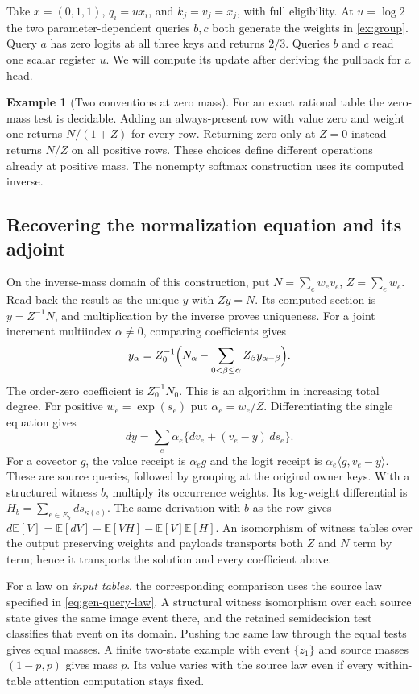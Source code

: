 \documentclass[11pt,a4paper]{article}
\theoremstyle{definition}
\newtheorem{example}[example]{Example}
\theoremstyle{remark}\newaliascnt{remark}{theorem}
\numberwithin{equation}{section}
\begin{document}
Take $x=(0,1,1)$, $q_i=u x_i$, and $k_j=v_j=x_j$, with full eligibility. At $u=\log 2$ the two parameter-dependent queries $b,c$ both generate the weights in \cref{ex:group}. Query $a$ has zero logits at all three keys and returns $2/3$. Queries $b$ and $c$ read one scalar register $u$. We will compute its update after deriving the pullback for a head.

\begin{example}[Two conventions at zero mass]
For an exact rational table the zero-mass test is decidable. Adding an always-present row with value zero and weight one returns $N/(1+Z)$ for every row. Returning zero only at $Z=0$ instead returns $N/Z$ on all positive rows. These choices define different operations already at positive mass. The nonempty softmax construction uses its computed inverse.
\end{example}

\subsection{Recovering the normalization equation and its adjoint}
On the inverse-mass domain of this construction, put $N=\sum_e w_ev_e$, $Z=\sum_e w_e$. Read back the result as the unique $y$ with $Zy=N$. Its computed section is $y=Z^{-1}N$, and multiplication by the inverse proves uniqueness. For a joint increment multiindex $\alpha\ne0$, comparing coefficients gives
\[
 y_\alpha=Z_0^{-1}\Bigl(N_\alpha-
       \sum_{0<\beta\le\alpha}Z_\beta y_{\alpha-\beta}\Bigr).
\]
The order-zero coefficient is $Z_0^{-1}N_0$. This is an algorithm in increasing total degree. For positive $w_e=\exp(s_e)$ put $\alpha_e=w_e/Z$. Differentiating the single equation gives
\[
 dy=\sum_e\alpha_e\{dv_e+(v_e-y)\,ds_e\}.
\]
For a covector $g$, the value receipt is $\alpha_e g$ and the logit receipt is $\alpha_e\langle g,v_e-y\rangle$. These are source queries, followed by grouping at the original owner keys. With a structured witness $b$, multiply its occurrence weights. Its log-weight differential is $H_b=\sum_{e\in E_b} ds_{\kappa(e)}$. The same derivation with $b$ as the row gives
$d\mathbb E[V]=\mathbb E[dV]+\mathbb E[VH]-\mathbb E[V]\mathbb E[H]$.
An isomorphism of witness tables over the output preserving weights and payloads transports both $Z$ and $N$ term by term; hence it transports the solution and every coefficient above.

For a law on \emph{input tables}, the corresponding comparison uses the source law specified in \cref{eq:gen-query-law}. A structural witness isomorphism over each source state gives the same image event there, and the retained semidecision test classifies that event on its domain. Pushing the same law through the equal tests gives equal masses. A finite two-state example with event $\{z_1\}$ and source masses $(1-p,p)$ gives mass $p$. Its value varies with the source law even if every within-table attention computation stays fixed.
\end{document}

